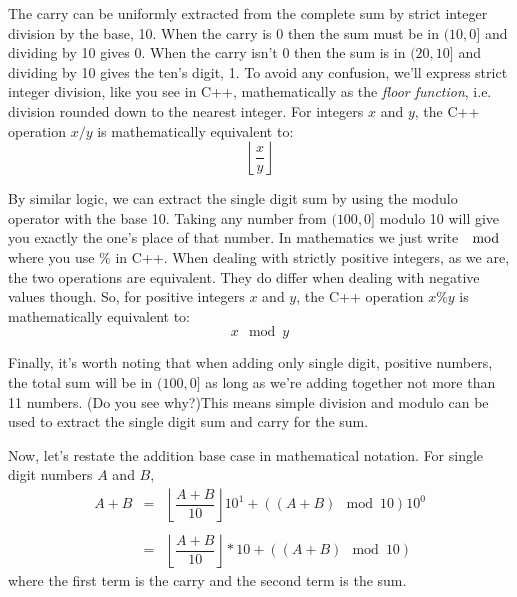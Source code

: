 \documentclass[10pt]{article}
\begin{document}
The carry can be uniformly extracted from the complete sum by strict integer division by the base, 10. When the carry is $0$ then the sum must be in $(10,0]$ and dividing by 10 gives 0. When the carry isn't $0$ then the sum is in $(20,10]$ and dividing by 10 gives the ten's digit, 1. To avoid any confusion, we'll express strict integer division, like you see in C++, mathematically as the \textit{floor function}, i.e. division rounded down to the nearest integer. For integers $x$ and $y$, the C++ operation $x/y$ is mathematically equivalent to:
\[
\left\lfloor\dfrac{x}{y}\right\rfloor
\]

By similar logic, we can extract the single digit sum by using the modulo operator with the base 10. Taking any number from $(100,0]$ modulo 10 will give you exactly the one's place of that number. In mathematics we just write $\mod$ where you use $\%$ in C++. When dealing with strictly positive integers, as we are, the two operations are equivalent. They do differ when dealing with negative values though. So, for positive integers $x$ and $y$, the C++ operation $x \% y$ is mathematically equivalent to:
\[
x \mod y
\]

Finally, it's worth noting that when adding only single digit, positive numbers, the total sum will be in $(100,0]$ as long as we're adding together not more than 11 numbers. (Do you see why?)This means simple division and modulo can be used to extract the single digit sum and carry for the sum. 

Now, let's restate the addition base case in mathematical notation. For single digit numbers $A$ and $B$,
\[
\begin{array}{rcl}
A+B &=& \left\lfloor\dfrac{A+B}{10}\right\rfloor10^1 + ((A+B)\mod 10)10^0 \\ \\
&=& \left\lfloor\dfrac{A+B}{10}\right\rfloor*10 + ((A+B)\mod 10)
\end{array}
\]
where the first term is the carry and the second term is the sum.
\end{document}
